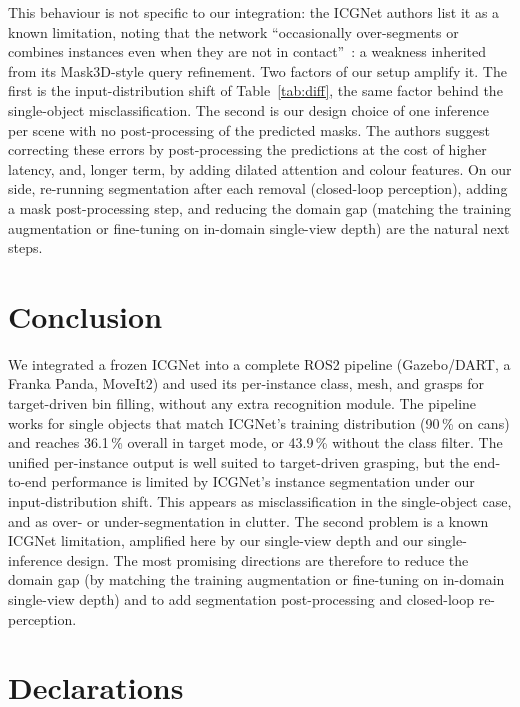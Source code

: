 \documentclass[10pt,twocolumn,letterpaper]{article}
\begin{document}
This behaviour is not specific to our integration: the ICGNet authors list it as a known limitation,
noting that the network ``occasionally over-segments or combines instances even when they are not in
contact''~\cite{zurbrugger2024icgnet}: a weakness inherited from its Mask3D-style query refinement.
Two factors of our setup amplify it. The first is the input-distribution shift of
Table~\ref{tab:diff}, the
same factor behind the single-object misclassification. The second is our design choice of one
inference per scene with no post-processing of the predicted masks. The authors suggest correcting
these errors by post-processing the predictions at the cost of higher latency, and, longer term, by
adding dilated attention and colour features. On our side, re-running segmentation after each removal
(closed-loop perception), adding a mask post-processing step, and reducing the domain gap (matching
the training augmentation or fine-tuning on in-domain single-view depth) are the natural next steps.

\section{Conclusion}
\label{sec:conclusion}

We integrated a frozen ICGNet into a complete ROS2 pipeline (Gazebo/DART, a Franka Panda, MoveIt2)
and used its per-instance class, mesh, and grasps for target-driven bin filling, without any extra
recognition module. The pipeline works for single objects that match ICGNet's training distribution
(90\,\% on cans) and reaches 36.1\,\% overall in target mode, or 43.9\,\% without the class filter.
The unified per-instance output is well suited to target-driven grasping, but the end-to-end
performance is limited by ICGNet's instance segmentation under our input-distribution shift. This
appears as misclassification in the single-object case, and as over- or under-segmentation in clutter.
The second problem is a known ICGNet limitation, amplified here by our single-view depth and our
single-inference design. The most promising directions are therefore to reduce the domain gap (by
matching the training augmentation or fine-tuning on in-domain single-view depth) and to add
segmentation post-processing and closed-loop re-perception.

\section*{Declarations}
\end{document}

